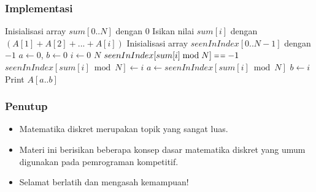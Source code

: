 \begin{frame}
\frametitle{Implementasi}
\begin{codebox}
\li \Comment Inisialisasi array $sum[0..N]$ dengan $0$
\li \Comment Isikan nilai $sum[i]$ dengan $(A[1] + A[2] + ... + A[i])$
\li \Comment Inisialisasi array $seenInIndex[0..N-1]$ dengan $-1$
\zi 
\li $a \gets 0$, $b \gets 0$
\li \For $i \gets 0$ \To $N$
    \Do
\li   \If $seenInIndex[sum[i] \bmod N] \isequal -1$
      \Then
\li     $seenInIndex[sum[i] \bmod N] \gets i$    
\li   \Else
\li     $a \gets seenInIndex[sum[i] \bmod N]$
\li     $b \gets i$
      \End
    \End
\zi
\li Print $A[a..b]$
\end{codebox}
\end{frame}

\begin{frame}
\frametitle{Penutup}
\begin{itemize}
  \item Matematika diskret merupakan topik yang sangat luas.
  \item Materi ini berisikan beberapa konsep dasar matematika diskret yang umum digunakan pada pemrograman kompetitif.
  \item Selamat berlatih dan mengasah kemampuan!
\end{itemize}
\end{frame}



